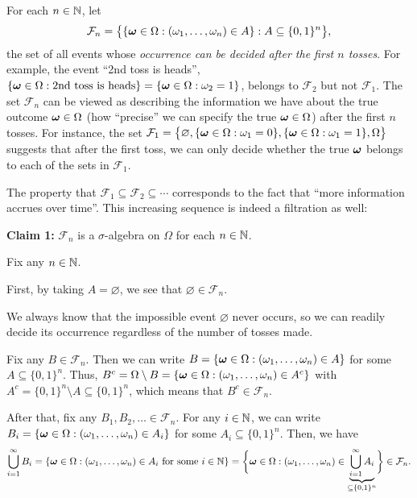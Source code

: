 \begin{enumerate}
For each \(n\in\mathbb{N}\), let
\[\mathcal{F}_n=\big\{\{\bm{\omega}\in\Omega:(\omega_1,\dotsc,\omega_n)\in
A\}: A\subseteq \{0,1\}^{n}\big\},
\]
the set of all events whose \emph{occurrence can be decided after the first
\(n\) tosses}. For example, the event ``2nd toss is heads'',
\(\{\bm{\omega}\in\Omega:\text{2nd toss is heads}\}
=\{\bm{\omega}\in\Omega:\omega_2=1\}\), belongs to \(\mathcal{F}_2\) but not
\(\mathcal{F}_1\). The set \(\mathcal{F}_n\) can be viewed as describing the
information we have about the true outcome \(\bm{\omega}\in\Omega\) (how
``precise'' we can specify the true \(\bm{\omega}\in\Omega\)) after the first
\(n\) tosses. For instance, the set \(\mathcal{F}_1=
\bigl\{\varnothing,\{\bm{\omega}\in\Omega:\omega_1=0\},\{\bm{\omega}\in\Omega:\omega_1=1\},\Omega\bigr\}\)
suggests that after the first toss, we can only decide whether the true
\(\bm{\omega}\) belongs to each of the sets in \(\mathcal{F}_1\).

The property that \(\mathcal{F}_{1}\subseteq \mathcal{F}_2\subseteq\dotsb \)
corresponds to the fact that ``more information accrues over time''.  This
increasing sequence is indeed a filtration as well:

\textbf{Claim 1:} \(\mathcal{F}_n\) is a \(\sigma\)-algebra on \(\Omega\) for each \(n\in\mathbb{N}\).

\begin{pf}
Fix any \(n\in\mathbb{N}\).

First, by taking \(A=\varnothing\), we see that
\(\varnothing\in\mathcal{F}_n\).
\begin{intuition}
We always know that the impossible event \(\varnothing\) never occurs, so
we can readily decide its occurrence regardless of the number of tosses made.
\end{intuition}

Fix any \(B\in\mathcal{F}_n\). Then we can write
\(B=\{\bm{\omega}\in\Omega:(\omega_1,\dotsc,\omega_n)\in A\}\) for some
\(A\subseteq \{0,1\}^{n}\). Thus, \(B^c=\Omega\setminus
B=\{\bm{\omega}\in\Omega:(\omega_1,\dotsc,\omega_n)\in A^c\}\) with
\(A^c=\{0,1\}^{n}\setminus A\subseteq \{0,1\}^{n}\), which means that
\(B^c\in\mathcal{F}_n\).

After that, fix any \(B_1,B_2,\dotsc\in\mathcal{F}_n\). For any \(i\in\mathbb{N}\), we
can write \(B_i=\{\bm{\omega}\in\Omega:(\omega_1,\dotsc,\omega_n)\in A_i\}\)
for some \(A_i\subseteq \{0,1\}^{n}\). Then, we have
\[
\bigcup_{i=1}^{\infty}B_i
=\{\bm{\omega}\in\Omega:(\omega_1,\dotsc,\omega_n)\in A_i\text{ for some \(i\in\mathbb{N}\)}\}
=\biggl\{\bm{\omega}\in\Omega:(\omega_1,\dotsc,\omega_n)\in
\underbrace{\bigcup_{i=1}^{\infty}A_i}_{\subseteq \{0,1\}^{n}}
\biggr\}
\in\mathcal{F}_n.
\]
\end{pf}


\end{enumerate}
